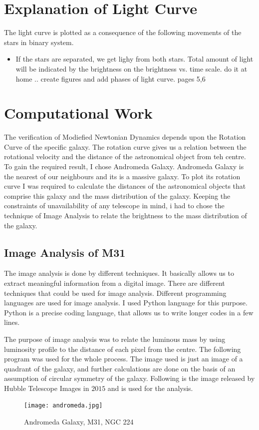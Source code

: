 \section*{Explanation of Light Curve}

The light curve is plotted as a consequence of the following movements of the stars in binary system.

\begin{itemize}
\item
If the stars are separated, we get lighy from both stars. Total amount of light will be indicated by the brightness on the brightness vs. time scale.
do it at home .. create figures and add phases of light curve. pages 5,6

\end{itemize}

\section{Computational Work}
The verification of Modiefied Newtonian Dynamics depends upon the Rotation Curve of the specific galaxy. The rotation curve gives us a relation between the rotational velocity and the distance of the astronomical object from teh centre. To gain the required result, I chose Andromeda Galaxy. Andromeda Galaxy is the nearest of our neighbours and its is a massive galaxy. To plot its rotation curve I was required to calculate the distances of the astronomical objects that comprise this galaxy and the mass distribution of the galaxy. Keeping the constraints of unavailability of any telescope in mind, i had to chose the technique of Image Analysis to relate the brightness to the mass distribution of the galaxy.
\subsection{Image Analysis of M31}
The image analysis is done by different techniques. It basically allows us to extract meaningful information from a digital image. There are different techniques that could be used for image analysis. Different programming languages are used for image analysis. I used Python language for this purpose. Python is a precise coding language, that allows us to write longer codes in a few lines.

The purpose of image analysis was to relate the luminous mass by using luminosity profile to the distance of each pixel from the centre. The following program was used for the whole process. The image used is just an image of a quadrant of the galaxy, and further calculations are done on the basis of an assumption of circular symmetry of the galaxy. Following is the image released by Hubble Telescope Images in $2015$ and is used for the analysis.
\begin{figure}[h!]
\centering
\texttt{[image: andromeda.jpg]}
\caption{Andromeda Galaxy, M31, NGC 224}
\end{figure}

